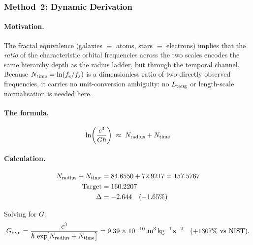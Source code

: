 \documentclass[11pt,a4paper]{article}
\begin{document}
      \subsubsection{Method~2: Dynamic Derivation}

        \paragraph{Motivation.}
        The fractal equivalence (galaxies $\equiv$ atoms, stars
        $\equiv$ electrons) implies that the \emph{ratio} of the
        characteristic orbital frequencies across the two scales
        encodes the same hierarchy depth as the radius ladder, but
        through the temporal channel.  Because $N_{\rm time} =
        \ln(f_e/f_s)$ is a dimensionless ratio of two directly observed
        frequencies, it carries no unit-conversion ambiguity: no $L_{\rm
        tang}$ or length-scale normalisation is needed here.

        \paragraph{The formula.}

        \begin{equation}
          \ln\!\left(\frac{c^3}{G\hbar}\right)
          \;\approx\;
          N_{\rm radius} + N_{\rm time}
          \label{eq:G_dynamic}
        \end{equation}

        \paragraph{Calculation.}
        \begin{align*}
          N_{\rm radius} + N_{\rm time}
            &= 84.6550 + 72.9217 = 157.5767 \\
          \text{Target}
            &= 160.2207 \\
          \Delta
            &= -2.644\quad(-1.65\%)
        \end{align*}

        Solving for $G$:
        \begin{equation}
          G_{\rm dyn}
          = \frac{c^3}{\hbar\,\exp\!\bigl[N_{\rm radius} + N_{\rm time}\bigr]}
          = 9.39 \times 10^{-10}\ \mathrm{m^3\,kg^{-1}\,s^{-2}}
          \quad (+1307\%\ \text{vs NIST}).
          \label{eq:G_dyn_value}
        \end{equation}
\end{document}
